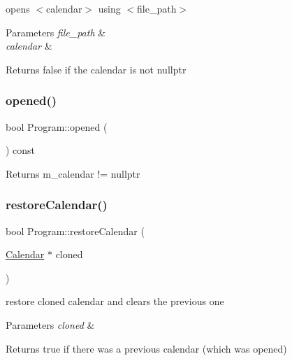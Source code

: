 opens $<$calendar$>$ using $<$file\+\_\+path$>$ 
\begin{DoxyParams}{Parameters}
{\em file\+\_\+path} & \\
\hline
{\em calendar} & \\
\hline
\end{DoxyParams}
\begin{DoxyReturn}{Returns}
false if the calendar is not nullptr 
\end{DoxyReturn}
\mbox{\label{classProgram_a2f494b9e0a50657ac89a61a96e92face}} 
\subsubsection{\texorpdfstring{opened()}{opened()}}
{\footnotesize\ttfamily bool Program\+::opened (\begin{DoxyParamCaption}{ }\end{DoxyParamCaption}) const}

\begin{DoxyReturn}{Returns}
m\+\_\+calendar != nullptr 
\end{DoxyReturn}
\mbox{\label{classProgram_a0c4c553237a075bc9ab5d4c6b80b4471}} 
\subsubsection{\texorpdfstring{restore\+Calendar()}{restoreCalendar()}}
{\footnotesize\ttfamily bool Program\+::restore\+Calendar (\begin{DoxyParamCaption}\item[{\hyperlink{classCalendar}{Calendar} $\ast$}]{cloned }\end{DoxyParamCaption})}

restore cloned calendar and clears the previous one 
\begin{DoxyParams}{Parameters}
{\em cloned} & \\
\hline
\end{DoxyParams}
\begin{DoxyReturn}{Returns}
true if there was a previous calendar (which was opened) 
\end{DoxyReturn}
\mbox{\label{classProgram_a9ab390cc3caa8cc7dee9704a273a6979}} 
